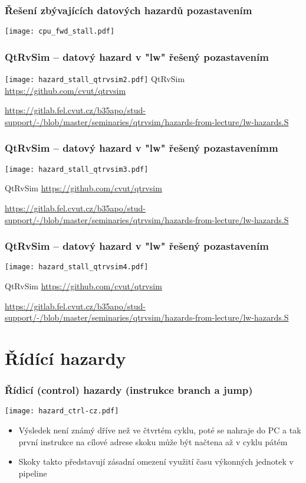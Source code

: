 \documentclass{beamer}
\begin{document}
\begin{frame}
\frametitle{Řešení zbývajících datových hazardů pozastavením}
\texttt{[image: cpu\_fwd\_stall.pdf]}
\end{frame}

\begin{frame}
\frametitle{QtRvSim -- datový hazard v "lw" řešený pozastavením}
\texttt{[image: hazard\_stall\_qtrvsim2.pdf]}
{\tiny
QtRvSim \url{https://github.com/cvut/qtrvsim}
}

{\Tiny
\url{https://gitlab.fel.cvut.cz/b35apo/stud-support/-/blob/master/seminaries/qtrvsim/hazards-from-lecture/lw-hazards.S}
}

\end{frame}

\begin{frame}
\frametitle{QtRvSim -- datový hazard v "lw" řešený pozastavenímm}
\texttt{[image: hazard\_stall\_qtrvsim3.pdf]}

{\tiny
QtRvSim \url{https://github.com/cvut/qtrvsim}
}

{\Tiny
\url{https://gitlab.fel.cvut.cz/b35apo/stud-support/-/blob/master/seminaries/qtrvsim/hazards-from-lecture/lw-hazards.S}
}

\end{frame}

\begin{frame}
\frametitle{QtRvSim -- datový hazard v "lw" řešený pozastavením}
\texttt{[image: hazard\_stall\_qtrvsim4.pdf]}

{\tiny
QtRvSim \url{https://github.com/cvut/qtrvsim}
}

{\Tiny
\url{https://gitlab.fel.cvut.cz/b35apo/stud-support/-/blob/master/seminaries/qtrvsim/hazards-from-lecture/lw-hazards.S}
}

\end{frame}

\section{Řídící hazardy}

\begin{frame}
\frametitle{Řídicí (control) hazardy (instrukce branch a jump)}
\texttt{[image: hazard\_ctrl-cz.pdf]}

\begin{itemize}
 \item Výsledek není známý dříve než ve čtvrtém cyklu, poté se nahraje do PC
       a tak první instrukce na cílové adrese skoku může být načtena až v cyklu pátém
 \item Skoky takto představují zásadní omezení využití času výkonných jednotek v pipeline
\end{itemize}

\end{frame}
\end{document}
